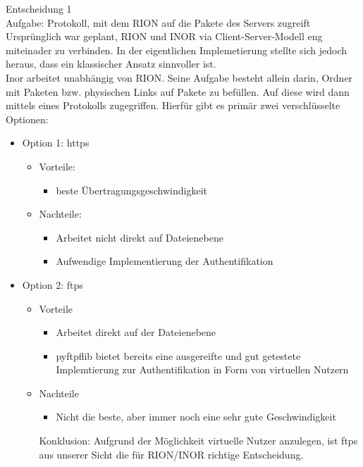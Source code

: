 Entscheidung 1\\
Aufgabe: Protokoll, mit dem RION auf die Pakete des Servers zugreift\\

Ursprünglich war geplant, RION und INOR via Client-Server-Modell eng miteinader zu
verbinden. In der eigentlichen Implemetierung stellte sich jedoch heraus, dass ein
klassischer Ansatz sinnvoller ist. \\

Inor arbeitet unabhängig von RION. Seine Aufgabe besteht allein darin, Ordner mit Paketen
bzw. physischen Links auf Pakete zu befüllen. Auf diese wird dann mittels eines Protokolls
zugegriffen. Hierfür gibt es primär zwei verschlüsselte Optionen:\\

\begin{itemize}
    \item Option 1: https
    \begin{itemize}
        \item Vorteile:
            \begin{itemize}
                \item beste Übertragungsgeschwindigkeit
            \end{itemize}
        \item Nachteile:
            \begin{itemize}
                \item Arbeitet nicht direkt auf Dateienebene
                \item Aufwendige Implementierung der Authentifikation
            \end{itemize}
    \end{itemize}
     \item Option 2: ftps
    \begin{itemize}
        \item Vorteile
        \begin{itemize}
        \item Arbeitet direkt auf der Dateienebene
        \item pyftpflib bietet bereits eine ausgereifte und gut getestete Implemtierung zur
Authentifikation in Form von virtuellen Nutzern
        \end{itemize}
        \item Nachteile
        \begin{itemize}
            \item Nicht die beste, aber immer noch eine sehr gute Geschwindigkeit
        \end{itemize}
        Konklusion: Aufgrund der Möglichkeit virtuelle Nutzer anzulegen, ist ftps aus unserer Sicht
die für RION/INOR richtige Entscheidung.


        
    \end{itemize}
\end{itemize}
\clearpage

